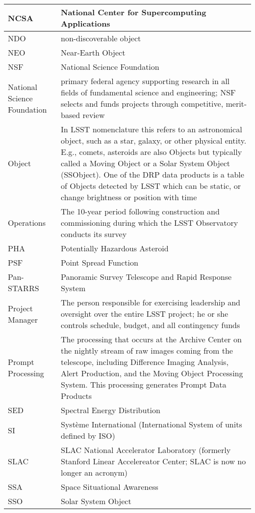 \begin{longtable}{|p{}|p{}|}
NCSA & National \gls{Center} for Supercomputing Applications \\\hline
NDO & non-discoverable object \\\hline
NEO & Near-Earth \gls{Object} \\\hline
NSF & \gls{National Science Foundation} \\\hline
National Science Foundation & primary federal agency supporting research in all fields of fundamental science and engineering; \gls{NSF} selects and funds projects through competitive, merit-based review \\\hline
Object & In \gls{LSST} nomenclature this refers to an \gls{astronomical object}, such as a star, galaxy, or other physical entity. E.g., comets, asteroids are also Objects but typically called a Moving Object or a \gls{Solar System Object} (SSObject). One of the \gls{DRP} data products is a table of Objects detected by \gls{LSST} which can be static, or change brightness or position with time \\\hline
Operations & The 10-year period following construction and commissioning during which the \gls{LSST} Observatory conducts its survey \\\hline
PHA & Potentially Hazardous Asteroid \\\hline
PSF & Point Spread Function \\\hline
Pan-STARRS & Panoramic Survey Telescope and Rapid Response System \\\hline
Project Manager & The person responsible for exercising leadership and oversight over the entire \gls{LSST} project; he or she controls schedule, budget, and all contingency funds \\\hline
Prompt Processing & The processing that occurs at the \gls{Archive} \gls{Center} on the nightly stream of raw images coming from the telescope, including Difference Imaging Analysis, \gls{Alert} Production, and the Moving \gls{Object} Processing System. This processing generates Prompt Data Products \\\hline
SED & \gls{Spectral Energy Distribution} \\\hline
SI & Syst\`eme International (International System of units defined by ISO) \\\hline
SLAC & \gls{SLAC} National Accelerator Laboratory (formerly Stanford Linear Accelereator \gls{Center}; \gls{SLAC} is now no longer an acronym) \\\hline
SSA & Space Situational Awareness \\\hline
SSO & \gls{Solar System Object} \\\hline

\end{longtable}
